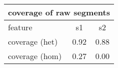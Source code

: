 \documentclass{standalone}
\begin{document}
\begin{tabular}{|l|c|c|}
\hline
\multicolumn{3}{|c|}{\textbf{coverage of raw segments}}\\
\hline 

feature & s1 & s2 \\
\hline
coverage (het) & 0.92 & 0.88 \\
coverage (hom) & 0.27 & 0.00 \\
\hline
\end{tabular}
\end{document}
